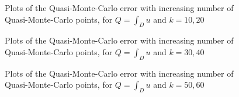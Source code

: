 \begin{figure}[h]
    \centering
  \begin{subfigure}{0.45\textwidth}

  \end{subfigure}
    \begin{subfigure}{0.45\textwidth}

    \end{subfigure}
\caption{Plots of the Quasi-Monte-Carlo error with increasing number of Quasi-Monte-Carlo points, for $Q=\int_D u$ and $k=10,20$ \label{fig:qmcintegral1020}}
\end{figure}
\begin{figure}[h]
    \centering
  \begin{subfigure}{0.45\textwidth}

  \end{subfigure}
    \begin{subfigure}{0.45\textwidth}

    \end{subfigure}
\caption{Plots of the Quasi-Monte-Carlo error with increasing number of Quasi-Monte-Carlo points, for $Q=\int_D u$ and $k=30,40$ \label{fig:qmcintegral3040}}
\end{figure}
\begin{figure}[h]
    \centering
  \begin{subfigure}{0.45\textwidth}

  \end{subfigure}
    \begin{subfigure}{0.45\textwidth}

    \end{subfigure}
\caption{Plots of the Quasi-Monte-Carlo error with increasing number of Quasi-Monte-Carlo points, for $Q=\int_D u$ and $k=50,60$ \label{fig:qmcintegral5060}}
\end{figure}


